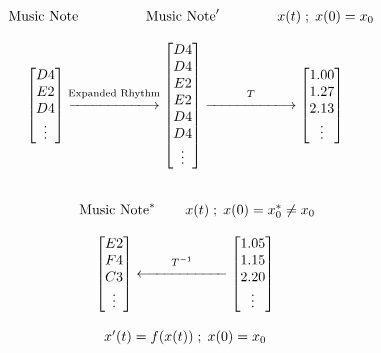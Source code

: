 \documentclass{article}
\begin{document}
\begin{align*}
\begin{array}{c@{\hspace{2cm}}c@{\hspace{2cm}}c}
\hspace{0.3cm} \text{Music Note} \hspace{1.7cm} \text{Music Note}^\prime \hspace{1.45cm} \text{\(x(t) \; ; \; x(0) = x_0\)} \\
\\
\begin{bmatrix}
D4 \\ 
E2 \\ 
D4 \\
\vdots
\end{bmatrix}
\overset{\text{Expanded Rhythm}}{\xlongrightarrow{\hspace{2cm}}}
\begin{bmatrix}
D4 \\ 
D4 \\ 
E2 \\
E2 \\
D4 \\
D4 \\
\vdots
\end{bmatrix}
\overset{T}{\xlongrightarrow{\hspace{2cm}}} 
\begin{bmatrix}
1.00 \\ 
1.27 \\ 
2.13 \\
\vdots
\end{bmatrix}\\
\\
\\
\hspace{0.6cm} \text{Music Note}^* \hspace{0.75cm} \text{\(x(t) \; ; \; x(0) = x^*_0 \neq x_0\)} \\
\\
\begin{bmatrix}
E2 \\ 
F4 \\
C3  \\
\vdots
\end{bmatrix}
\overset{T^{-1}}{\xlongleftarrow{\hspace{2cm}}}
\begin{bmatrix}
1.05 \\ 
1.15 \\
2.20  \\
\vdots
\end{bmatrix} \\ \\
x^\prime(t) = f(x(t)) \; ; \; x(0) = x_0
\end{array}
\end{align*}
\end{document}
